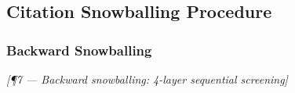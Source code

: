 \subsection{Citation Snowballing Procedure}
\label{sec:methodology:snowballing}


\subsubsection{Backward Snowballing}
\label{sec:methodology:snowballing:backward}


\bigskip\noindent\textit{[¶7 — Backward snowballing: 4-layer sequential screening]}

